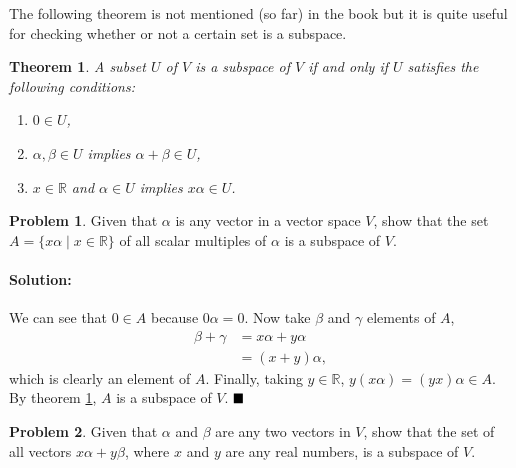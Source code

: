 \documentclass[]{article}
\newcommand{\RR}{\mathbb{R}}
\newtheorem{theorem}{Theorem}[section]
\theoremstyle{definition}
\newtheorem{problem}{Problem}
\newenvironment{solution}{\paragraph{Solution:}}{\hfill$\blacksquare \\$}
\begin{document}
The following theorem is not mentioned (so far) in the book but it is quite useful for checking whether or not a certain set is a subspace.
\begin{theorem}\label{subspace:1}
	A subset $U$ of $V$ is a subspace of $V$ if and only if $U$ satisfies the following conditions:
	\begin{enumerate}
		\item $0 \in U$,
		\item $\alpha, \beta \in U$ implies $\alpha + \beta \in U$,
		\item $x \in \RR$ and $\alpha \in U$ implies $x\alpha \in U$.
	\end{enumerate}
\end{theorem}
\begin{problem}
	Given that $\alpha$ is any vector in a vector space $V$, show that the set $A = \{x\alpha \mid x \in \RR \}$ of all scalar multiples of $\alpha$ is a subspace of $V$.
\end{problem}
\begin{solution}
	We can see that $0 \in A$  because $0 \alpha = 0$. Now take $\beta$ and $\gamma$ elements of $A$, 
	\begin{align*}
		\beta + \gamma &= x \alpha + y \alpha \\ 
		&= (x + y)\alpha,
	\end{align*}
	which is clearly an element of $A$. Finally, taking $y \in \RR$, $y(x\alpha) = (yx) \alpha \in A$.
	By theorem \ref{subspace:1}, $A$ is a subspace of $V$.
\end{solution}
\begin{problem}
	Given that $\alpha$ and $\beta$ are any two vectors in $V$, show that the set of all vectors $x\alpha + y\beta$, where $x$ and $y$ are any real numbers, is a subspace of $V$.
\end{problem}
\end{document}
